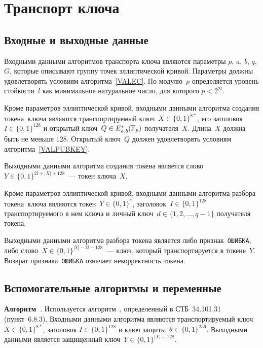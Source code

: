 \section{Транспорт ключа}\label{TRANSPORT}

\subsection{Входные и выходные данные}\label{TRANSPORT.InOut}
	
Входными данными алгоритмов транспорта ключа являются 
параметры $p$, $a$, $b$, $q$, $G$, которые описывают группу 
точек эллиптической кривой.
Параметры должны удовлетворять условиям алгоритма~\ref{VALEC}.
По модулю~$p$ определяется уровень стойкости~$l$ как минимальное 
натуральное число, для которого $p<2^{2l}$.

Кроме параметров эллиптической кривой,
входными данными алгоритма создания токена~ключа являются
транспортируемый ключ~$X\in\{0,1\}^{8*}$,
его заголовок~$I\in\{0,1\}^{128}$
и открытый ключ~$Q\in E_{a,b}^*(\mathbb{F}_p)$ получателя~$X$.
%
Длина~$X$ должна быть не меньше $128$.
%
Открытый ключ~$Q$ должен удовлетворять условиям 
алгоритма~\ref{VALPUBKEY}.

Выходными данными алгоритма создания токена является 
слово $Y\in\{0,1\}^{2l+|X|+128}$~--- токен ключа~$X$.

Кроме параметров эллиптической кривой,
входными данными алгоритма разбора токена~ключа являются 
токен~$Y\in\{0,1\}^*$,
заголовок~$I\in\{0,1\}^{128}$ транспортируемого в нем ключа
и личный ключ~$d\in\{1,2,\ldots,q-1\}$ получателя токена.

Выходными данными алгоритма разбора токена 
является либо признак~\texttt{ОШИБКА},
либо слово~$X\in\{0,1\}^{|Y|-2l-128}$~---
ключ, который транспортируется в токене~$Y$.
%
Возврат признака~\texttt{ОШИБКА} означает некорректность токена.

\subsection{Вспомогательные алгоритмы и переменные}
\label{TRANSPORT.Aux}

{\bf Алгоритм~}.
Используется алгоритм~,
определенный в СТБ~34.101.31 (пункт~6.8.3).
Входными данными алгоритма являются
транспортируемый ключ~$X\in\{0,1\}^{8*}$, заголовок $I\in\{0,1\}^{128}$
и ключ защиты~$\theta\in\{0,1\}^{256}$.
Выходными данными является
защищенный ключ~$Y\in\{0,1\}^{|X|+128}$.

